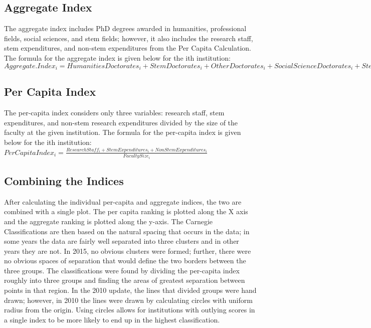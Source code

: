 \documentclass{article}\usepackage[]{graphicx}\usepackage[]{color}
\begin{document}
\subsection{Aggregate Index}
 The aggregate index includes PhD degrees awarded in humanities, professional fields, social sciences, and stem fields; however, it also includes the research staff, stem expenditures, and non-stem expenditures from the Per Capita Calculation.
 The formula for the aggregate index is given below for the ith institution:
 $Aggregate.Index_{i}  = HumanitiesDoctorates_{i} + StemDoctorates_{i} + OtherDoctorates_{i} + SocialScienceDoctorates_{i} + StemExpenditures_{i} + NonStemExpenditures_{i} + ResearchStaff_{i} $ 

  \subsection{Per Capita Index}
 The per-capita index considers only three variables: research staff, stem expenditures, and non-stem research expenditures divided by the size of the faculty at the given institution. 
     The formula for the per-capita index is given below for the ith institution: 
     $ PerCapitaIndex_{i} = \frac{ResearchStaff_{i} + StemExpenditures_{i} + NonStemExpenditures_{i}}{FacultySize_{i}}$
  \subsection{Combining the Indices}
  After calculating the individual per-capita and aggregate indices, the two are combined with a single plot. The per capita ranking is plotted along the X axis and the aggregate ranking is plotted along the y-axis. The Carnegie Classifications are then based on the natural spacing that occurs in the data; in some years the data are fairly well separated into three clusters and in other years they are not. 
  In 2015, no obvious clusters were formed; further, there were no obvious spaces of separation that would define the two borders between the three groups. The classifications were found by dividing the per-capita index roughly into three groups and finding the areas of greatest separation between points in that region. In the 2010 update, the lines that divided groups were hand drawn; however, in 2010 the lines were drawn by calculating circles with uniform radius from the origin. Using circles allows for institutions with outlying scores in a single index to be more likely to end up in the highest classification. 
\end{document}
